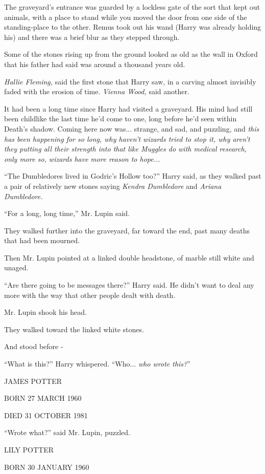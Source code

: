 The graveyard's entrance was guarded by a lockless gate of the sort that kept out animals, with a place to stand while you moved the door from one side of the standing-place to the other. Remus took out his wand (Harry was already holding his) and there was a brief blur as they stepped through.

Some of the stones rising up from the ground looked as old as the wall in Oxford that his father had said was around a thousand years old.

\emph{Hallie Fleming,} said the first stone that Harry saw, in a carving almost invisibly faded with the erosion of time. \emph{Vienna Wood,} said another.

It had been a long time since Harry had visited a graveyard. His mind had still been childlike the last time he'd come to one, long before he'd seen within Death's shadow. Coming here now was... strange, and sad, and puzzling, and \emph{this has been happening for so long, why haven't wizards tried to stop it, why aren't they putting all their strength into that like Muggles do with medical research, only more so, wizards have more reason to hope...}

``The Dumbledores lived in Godric's Hollow too?'' Harry said, as they walked past a pair of relatively new stones saying \emph{Kendra Dumbledore} and \emph{Ariana Dumbledore.}

``For a long, long time,'' Mr. Lupin said.

They walked further into the graveyard, far toward the end, past many deaths that had been mourned.

Then Mr. Lupin pointed at a linked double headstone, of marble still white and unaged.

``Are there going to be messages there?'' Harry said. He didn't want to deal any more with the way that other people dealt with death.

Mr. Lupin shook his head.

They walked toward the linked white stones.

And stood before -

``What is this?'' Harry whispered. ``Who... \emph{who wrote this?}''

JAMES POTTER

BORN 27 MARCH 1960

DIED 31 OCTOBER 1981

``Wrote what?'' said Mr. Lupin, puzzled.

LILY POTTER

BORN 30 JANUARY 1960

